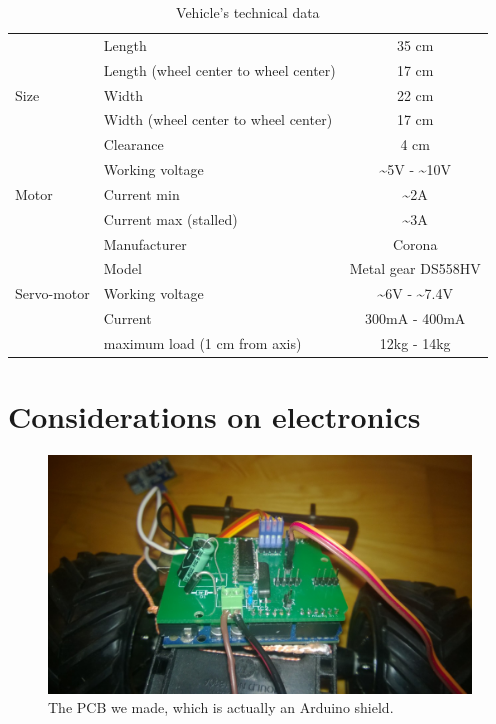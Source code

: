 \documentclass[a4paper,11pt]{report}
\begin{document}
{\begin{enumerate}
\begin{table}[h!]
\begin{center}
  \begin{tabular}{|p{4cm}|p{4cm}|c|}
    \hline
    \multirow{5}{*}{Size}
    &Length & 35 cm \\ \cline{2-3}
    &Length (wheel center to wheel center)& 17 cm \\ \cline{2-3}
    &Width & 22 cm \\ \cline{2-3}
    &Width (wheel center to wheel center) & 17 cm \\ \cline{2-3}
    & Clearance & 4 cm\\ \hline
    \multirow{3}{*}{Motor}
    & Working voltage & \~{}5V - \~{}10V  \\ \cline{2-3}
    & Current min & \~{}2A \\ \cline{2-3}
    & Current max (stalled) & \~{}3A \\ \hline
    \multirow{5}{*}{Servo-motor}
    & Manufacturer & Corona \\ \cline{2 - 3}
    & Model & Metal gear DS558HV\\ \cline{2-3}
    & Working voltage & \~{}6V - \~{}7.4V  \\ \cline{2-3}
    & Current & 300mA - 400mA \\ \cline{2-3}
    & maximum load (1 cm from axis) & 12kg - 14kg \\  
 \hline
	\end{tabular}
\end{center}
\caption{Vehicle's technical data\label{caracteristiquesDuVehicule}}
\end{table}

\section{Considerations on electronics}

\begin{figure}[h!]
\centering
\includegraphics[width=1.0\textwidth]{PCB.jpg}
    \caption{\label{PCB} The PCB we made, which is actually an Arduino shield.
    }
\end{figure}


\end{enumerate}}
\end{document}

